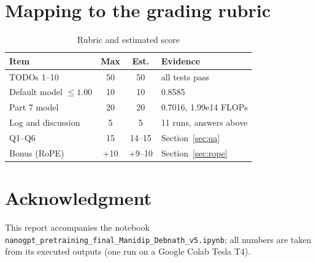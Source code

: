 \documentclass[10pt,twocolumn]{article}
\begin{document}
\section{Mapping to the grading rubric}\label{app:rubric}
\begin{table}[H]\centering\caption{Rubric and estimated score}\label{tab:rubric}
\footnotesize\begin{tabular}{p{1.55in}ccp{0.85in}}\toprule
Item & Max & Est. & Evidence\\\midrule
TODOs 1--10 & 50 & 50 & all tests pass\\
Default model $\le1.00$ & 10 & 10 & 0.8585\\
Part 7 model & 20 & 20 & 0.7016, 1.99e14 FLOPs\\
Log and discussion & 5 & 5 & 11 runs, answers above\\
Q1--Q6 & 15 & 14--15 & Section~\ref{sec:qa}\\
Bonus (RoPE) & +10 & +9--10 & Section~\ref{sec:rope}\\\bottomrule\end{tabular}\end{table}

\section*{Acknowledgment}
This report accompanies the notebook \texttt{nanogpt\_pretraining\_final\_Manidip\_Debnath\_v5.ipynb}; all numbers are taken from its executed outputs (one run on a Google Colab Tesla T4).
\end{document}

